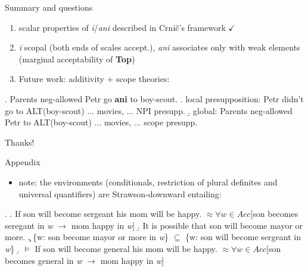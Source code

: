 \documentclass[ignorenonframetext,]{beamer}
\providecommand{\tightlist}{%
  \setlength{\itemsep}{0pt}\setlength{\parskip}{0pt}}
\begin{document}
\begin{frame}{Summary and questions}

\begin{enumerate}
\def\labelenumi{\arabic{enumi})}
\item
	scalar properties of \textit{i}/\textit{ani} described in Crnič's framework $\checkmark$
\item
	\textit{i} scopal (both ends of scales accept.), \textit{ani} associates only with weak elements (marginal acceptability of \textbf{Top})
\item Future work: additivity + scope theories: 
\end{enumerate}

\ex. Parents neg-allowed Petr go \textbf{ani} to boy-scout.
\a. local presupposition: Petr didn't go to ALT(boy-scout) ... movies, ... \hfill NPI presupp.
\b. global: Parents neg-allowed Petr to ALT(boy-scout) ... movies, ... \hfill scope presupp.

\end{frame}

\begin{frame}

\begin{center}
\Huge Thanks!
\end{center}

\end{frame}

\begin{frame}{Appendix}

\begin{itemize}
\tightlist
\item
  note: the environments (conditionals, restriction of plural definites
  and universal quantifiers) are Strawson-downward entailing:
\end{itemize}

\ex. \a. If son will become sergeant his mom will be happy.\newline
\(\approx \forall w \in Acc\){[}son becomes seregant in \emph{w}
\(\rightarrow\) mom happy in \emph{w}{]} \b. It is possible that son
will become mayor or more. \c. \{w: son become mayor or more in
\emph{w}\} \(\subseteq\) \{w: son will become sergeant in \emph{w}\} \d.
\(\models\) If son will become general his mom will be happy.\newline
\(\approx \forall w \in Acc\){[}son becomes general in \emph{w}
\(\rightarrow\) mom happy in \emph{w}{]}

\end{frame}
\end{document}

